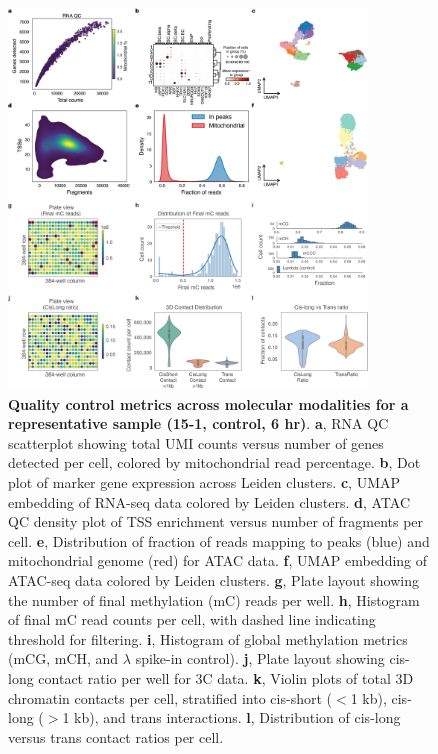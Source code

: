 \begin{figure}[p]
    \centering
    \includegraphics[width=0.85\textwidth]{3_figures-and-files/ExtendedFig1.png}
    \caption[Quality control across molecular modalities]{\textbf{Quality control metrics across molecular modalities for a representative sample (15-1, control, 6 hr)}. \textbf{a}, RNA QC scatterplot showing total UMI counts versus number of genes detected per cell, colored by mitochondrial read percentage. \textbf{b}, Dot plot of marker gene expression across Leiden clusters. \textbf{c}, UMAP embedding of RNA-seq data colored by Leiden clusters. \textbf{d}, ATAC QC density plot of TSS enrichment versus number of fragments per cell. \textbf{e}, Distribution of fraction of reads mapping to peaks (blue) and mitochondrial genome (red) for ATAC data. \textbf{f}, UMAP embedding of ATAC-seq data colored by Leiden clusters. \textbf{g}, Plate layout showing the number of final methylation (mC) reads per well. \textbf{h}, Histogram of final mC read counts per cell, with dashed line indicating threshold for filtering. \textbf{i}, Histogram of global methylation metrics (mCG, mCH, and $\lambda$ spike-in control). \textbf{j}, Plate layout showing cis-long contact ratio per well for 3C data. \textbf{k}, Violin plots of total 3D chromatin contacts per cell, stratified into cis-short ($<$1 kb), cis-long ($>$1 kb), and trans interactions. \textbf{l}, Distribution of cis-long versus trans contact ratios per cell.}
    \label{fig:3 supplementary_1}
\end{figure}

